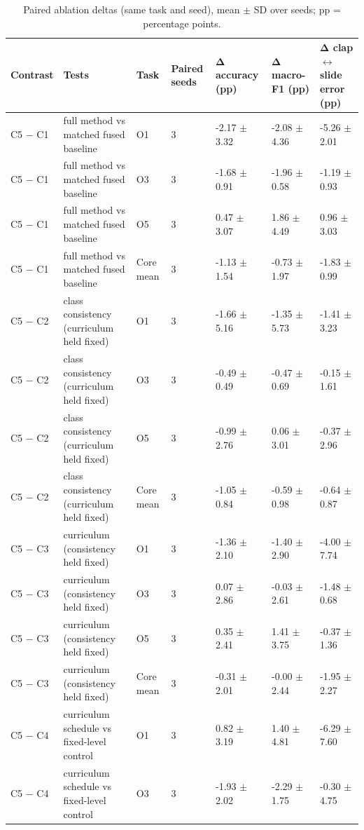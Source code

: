 \begin{table}[t]
\centering
\small
\caption{Paired ablation deltas (same task and seed), mean $\pm$ SD over seeds; pp = percentage points.}
\label{tab:T3_ablation}
\begin{tabular}{lllllll}
\hline
Contrast & Tests & Task & Paired seeds & Δ accuracy (pp) & Δ macro-F1 (pp) & Δ clap$\leftrightarrow$slide error (pp) \\
\hline
C5 $-$ C1 & full method vs matched fused baseline & O1 & 3 & -2.17 $\pm$ 3.32 & -2.08 $\pm$ 4.36 & -5.26 $\pm$ 2.01 \\
C5 $-$ C1 & full method vs matched fused baseline & O3 & 3 & -1.68 $\pm$ 0.91 & -1.96 $\pm$ 0.58 & -1.19 $\pm$ 0.93 \\
C5 $-$ C1 & full method vs matched fused baseline & O5 & 3 & 0.47 $\pm$ 3.07 & 1.86 $\pm$ 4.49 & 0.96 $\pm$ 3.03 \\
C5 $-$ C1 & full method vs matched fused baseline & Core mean & 3 & -1.13 $\pm$ 1.54 & -0.73 $\pm$ 1.97 & -1.83 $\pm$ 0.99 \\
C5 $-$ C2 & class consistency (curriculum held fixed) & O1 & 3 & -1.66 $\pm$ 5.16 & -1.35 $\pm$ 5.73 & -1.41 $\pm$ 3.23 \\
C5 $-$ C2 & class consistency (curriculum held fixed) & O3 & 3 & -0.49 $\pm$ 0.49 & -0.47 $\pm$ 0.69 & -0.15 $\pm$ 1.61 \\
C5 $-$ C2 & class consistency (curriculum held fixed) & O5 & 3 & -0.99 $\pm$ 2.76 & 0.06 $\pm$ 3.01 & -0.37 $\pm$ 2.96 \\
C5 $-$ C2 & class consistency (curriculum held fixed) & Core mean & 3 & -1.05 $\pm$ 0.84 & -0.59 $\pm$ 0.98 & -0.64 $\pm$ 0.87 \\
C5 $-$ C3 & curriculum (consistency held fixed) & O1 & 3 & -1.36 $\pm$ 2.10 & -1.40 $\pm$ 2.90 & -4.00 $\pm$ 7.74 \\
C5 $-$ C3 & curriculum (consistency held fixed) & O3 & 3 & 0.07 $\pm$ 2.86 & -0.03 $\pm$ 2.61 & -1.48 $\pm$ 0.68 \\
C5 $-$ C3 & curriculum (consistency held fixed) & O5 & 3 & 0.35 $\pm$ 2.41 & 1.41 $\pm$ 3.75 & -0.37 $\pm$ 1.36 \\
C5 $-$ C3 & curriculum (consistency held fixed) & Core mean & 3 & -0.31 $\pm$ 2.01 & -0.00 $\pm$ 2.44 & -1.95 $\pm$ 2.27 \\
C5 $-$ C4 & curriculum schedule vs fixed-level control & O1 & 3 & 0.82 $\pm$ 3.19 & 1.40 $\pm$ 4.81 & -6.29 $\pm$ 7.60 \\
C5 $-$ C4 & curriculum schedule vs fixed-level control & O3 & 3 & -1.93 $\pm$ 2.02 & -2.29 $\pm$ 1.75 & -0.30 $\pm$ 4.75 \\

\end{tabular}
\end{table}
